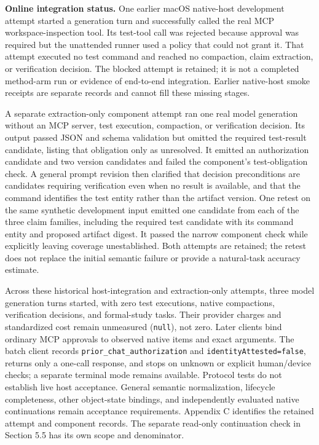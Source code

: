 \documentclass[
  11pt,
  a4paper,
]{article}
\begin{document}
\textbf{Online integration status.} One earlier macOS native-host
development attempt started a generation turn and successfully called
the real MCP workspace-inspection tool. Its test-tool call was rejected
because approval was required but the unattended runner used a policy
that could not grant it. That attempt executed no test command and
reached no compaction, claim extraction, or verification decision. The
blocked attempt is retained; it is not a completed method-arm run or
evidence of end-to-end integration. Earlier native-host smoke receipts
are separate records and cannot fill these missing stages.

A separate extraction-only component attempt ran one real model
generation without an MCP server, test execution, compaction, or
verification decision. Its output passed JSON and schema validation but
omitted the required test-result candidate, listing that obligation only
as unresolved. It emitted an authorization candidate and two version
candidates and failed the component's test-obligation check. A general
prompt revision then clarified that decision preconditions are
candidates requiring verification even when no result is available, and
that the command identifies the test entity rather than the artifact
version. One retest on the same synthetic development input emitted one
candidate from each of the three claim families, including the required
test candidate with its command entity and proposed artifact digest. It
passed the narrow component check while explicitly leaving coverage
unestablished. Both attempts are retained; the retest does not replace
the initial semantic failure or provide a natural-task accuracy
estimate.

Across these historical host-integration and extraction-only attempts,
three model generation turns started, with zero test executions, native
compactions, verification decisions, and formal-study tasks. Their
provider charges and standardized cost remain unmeasured
(\texttt{null}), not zero. Later clients bind ordinary MCP approvals to
observed native items and exact arguments. The batch client records
\texttt{prior\_chat\_authorization} and \texttt{identityAttested=false},
returns only a one-call response, and stops on unknown or explicit
human/device checks; a separate terminal mode remains available.
Protocol tests do not establish live host acceptance. General semantic
normalization, lifecycle completeness, other object-state bindings, and
independently evaluated native continuations remain acceptance
requirements. Appendix C identifies the retained attempt and component
records. The separate read-only continuation check in Section 5.5 has
its own scope and denominator.
\end{document}
